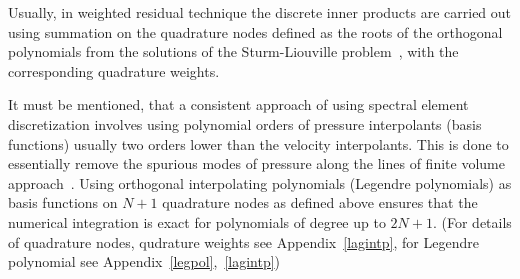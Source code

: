 Usually, in weighted residual technique the discrete inner products are carried out using summation on the quadrature nodes defined as the roots of the orthogonal polynomials from the solutions of the Sturm-Liouville problem~\cite{sturm2}, with the corresponding quadrature weights.

It must be mentioned, that a consistent approach of using spectral element discretization involves using polynomial orders of pressure interpolants (basis functions) usually two orders lower than the velocity interpolants. This is done to essentially remove the spurious modes of pressure along the lines of finite volume approach~\cite{patera2,deville}. Using orthogonal interpolating polynomials (Legendre polynomials) as basis functions on $N+1$ quadrature nodes as defined above ensures that the numerical integration is exact for polynomials of degree up to $2N+1$. (For details of quadrature nodes, qudrature weights see Appendix~\ref{lagintp}, for Legendre polynomial see Appendix~\ref{legpol},~\ref{lagintp})

